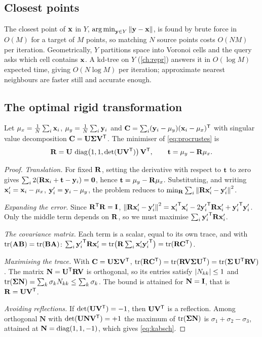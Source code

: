 \subsection{Closest points}

The closest point of $\bx$ in $Y$, $\argmin_{\by\in Y}\norm{\by-\bx}$, is found by brute force in
$O(M)$ for a target of $M$ points, so matching $N$ source points costs $O(NM)$ per iteration.
Geometrically, $Y$ partitions space into Voronoi cells and the query asks which cell contains
$\bx$. A kd-tree on $Y$ (\cref{ch:repr}) answers it in $O(\log M)$ expected time, giving
$O(N\log M)$ per iteration; approximate nearest neighbours are faster still and accurate enough.

\subsection{The optimal rigid transformation}

\begin{theorem}
Let $\mu_x=\frac1N\sum_i\bx_i$, $\mu_y=\frac1N\sum_i\by_i$ and
$\mC=\sum_i(\by_i-\mu_y)(\bx_i-\mu_x)\T$ with singular value decomposition
$\mC=\mU\mSigma\mV\T$. The minimiser of \eqref{eq:procrustes} is
\begin{equation}
\mR=\mU\,\diag\bigl(1,1,\det(\mU\mV\T)\bigr)\,\mV\T,\qquad \bt=\mu_y-\mR\mu_x .
\label{eq:kabsch}
\end{equation}
\end{theorem}

\begin{proof}
\emph{Translation.} For fixed $\mR$, setting the derivative with respect to $\bt$ to zero gives
$\sum_i2(\mR\bx_i+\bt-\by_i)=\bzero$, hence $\bt=\mu_y-\mR\mu_x$. Substituting, and writing
$\bx_i'=\bx_i-\mu_x$, $\by_i'=\by_i-\mu_y$, the problem reduces to
$\min_\mR\sum_i\norm{\mR\bx'_i-\by'_i}^2$.

\emph{Expanding the error.} Since $\mR\T\mR=\mI$,
$\norm{\mR\bx'_i-\by'_i}^2={\bx'_i}\T\bx'_i-2{\by'_i}\T\mR\bx'_i+{\by'_i}\T\by'_i$. Only the middle term
depends on $\mR$, so we must maximise $\sum_i{\by'_i}\T\mR\bx'_i$.

\emph{The covariance matrix.} Each term is a scalar, equal to its own trace, and with
$\tr(\mA\mB)=\tr(\mB\mA)$: $\sum_i{\by'_i}\T\mR\bx_i'=\tr\bigl(\mR\sum_i\bx'_i{\by'_i}\T\bigr)=\tr(\mR\mC\T)$.

\emph{Maximising the trace.} With $\mC=\mU\mSigma\mV\T$,
$\tr(\mR\mC\T)=\tr(\mR\mV\mSigma\mU\T)=\tr(\mSigma\,\mU\T\mR\mV)$. The matrix
$\mathbf N=\mU\T\mR\mV$ is orthogonal, so its entries satisfy $\abs{N_{kk}}\le1$ and
$\tr(\mSigma\mathbf N)=\sum_k\sigma_kN_{kk}\le\sum_k\sigma_k$. The bound is attained for
$\mathbf N=\mI$, that is $\mR=\mU\mV\T$.

\emph{Avoiding reflections.} If $\det(\mU\mV\T)=-1$, then $\mU\mV\T$ is a reflection. Among
orthogonal $\mathbf N$ with $\det(\mU\mathbf N\mV\T)=+1$ the maximum of $\tr(\mSigma\mathbf N)$ is
$\sigma_1+\sigma_2-\sigma_3$, attained at $\mathbf N=\diag(1,1,-1)$, which gives
\eqref{eq:kabsch}.
\end{proof}

